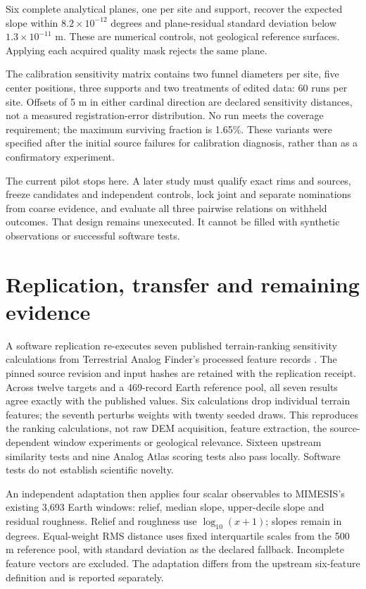 \documentclass{article}
\begin{document}
Six complete analytical planes, one per site and support, recover the expected slope within $8.2\times10^{-12}$ degrees and plane-residual standard deviation below $1.3\times10^{-11}$ m. These are numerical controls, not geological reference surfaces. Applying each acquired quality mask rejects the same plane.

The calibration sensitivity matrix contains two funnel diameters per site, five center positions, three supports and two treatments of edited data: 60 runs per site. Offsets of 5 m in either cardinal direction are declared sensitivity distances, not a measured registration-error distribution. No run meets the coverage requirement; the maximum surviving fraction is 1.65\%. These variants were specified after the initial source failures for calibration diagnosis, rather than as a confirmatory experiment.

The current pilot stops here. A later study must qualify exact rims and sources, freeze candidates and independent controls, lock joint and separate nominations from coarse evidence, and evaluate all three pairwise relations on withheld outcomes. That design remains unexecuted. It cannot be filled with synthetic observations or successful software tests.

\clearpage
\section{Replication, transfer and remaining evidence}
\label{app:claims}
A software replication re-executes seven published terrain-ranking sensitivity calculations from Terrestrial Analog Finder's processed feature records \cite{terrainfinder}. The pinned source revision and input hashes are retained with the replication receipt. Across twelve targets and a 469-record Earth reference pool, all seven results agree exactly with the published values. Six calculations drop individual terrain features; the seventh perturbs weights with twenty seeded draws. This reproduces the ranking calculations, not raw DEM acquisition, feature extraction, the source-dependent window experiments or geological relevance. Sixteen upstream similarity tests and nine Analog Atlas scoring tests also pass locally. Software tests do not establish scientific novelty.

An independent adaptation then applies four scalar observables to MIMESIS's existing 3,693 Earth windows: relief, median slope, upper-decile slope and residual roughness. Relief and roughness use $\log_{10}(x+1)$; slopes remain in degrees. Equal-weight RMS distance uses fixed interquartile scales from the 500 m reference pool, with standard deviation as the declared fallback. Incomplete feature vectors are excluded. The adaptation differs from the upstream six-feature definition and is reported separately.
\end{document}
